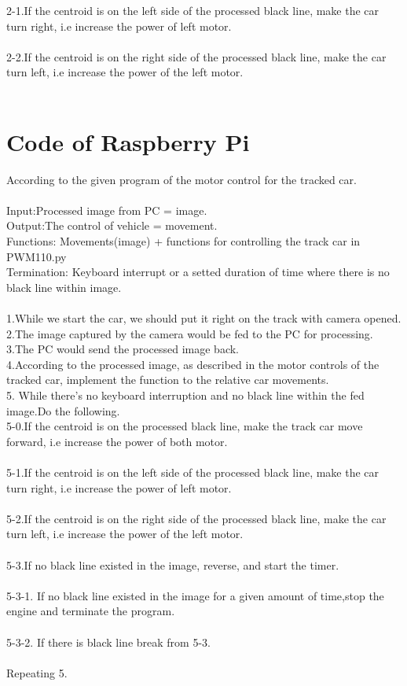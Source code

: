 \documentclass[12pt]{article}
\begin{document}
2-1.If the centroid is on the left side of the processed black line, make the car turn right, i.e increase the power of left motor.\\\\
2-2.If the centroid is on the right side of the processed black line, make the car turn left, i.e increase the power of the left motor.\\\\


\section{Code of Raspberry Pi}
According to the given program of the motor control for the tracked car.\\
\\
Input:Processed image from PC = image. \\
Output:The control of vehicle  = movement.\\
Functions: Movements(image) + functions for controlling the track car in PWM110.py\\
Termination: Keyboard interrupt or a setted duration of time where there is no black line within image.\\\\
1.While we start the car, we should put it right on the track with camera opened.\\
2.The image captured by the camera would be fed to the PC for processing.\\
3.The PC would send the processed image back.\\
4.According to the processed image, as described in the motor controls of the tracked car, implement the function to the relative car movements.\\
5. While there's no keyboard interruption and no black line within the fed image.Do the following.\\
5-0.If the centroid is on the processed black line, make the track car move forward, i.e increase the power of both motor. \\\\
5-1.If the centroid is on the left side of the processed black line, make the car turn right, i.e increase the power of left motor.\\\\
5-2.If the centroid is on the right side of the processed black line, make the car turn left, i.e increase the power of the left motor.\\\\
5-3.If no black line existed in the image, reverse, and start the timer.\\\\
5-3-1. If no black line existed in the image for a given amount of time,stop the engine and terminate the program.\\\\
5-3-2. If there is black line break from 5-3.\\\\
Repeating 5.\\\\
\end{document}
